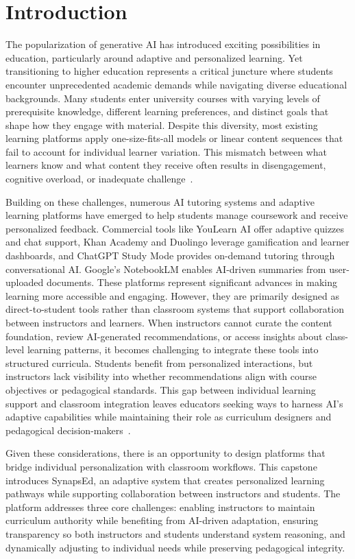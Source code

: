 \documentclass{stylefiles/capstone}
\begin{document}
\section{Introduction}

The popularization of generative AI has introduced exciting possibilities in education, particularly around adaptive and personalized learning. Yet transitioning to higher education represents a critical juncture where students encounter unprecedented academic demands while navigating diverse educational backgrounds. Many students enter university courses with varying levels of prerequisite knowledge, different learning preferences, and distinct goals that shape how they engage with material. Despite this diversity, most existing learning platforms apply one-size-fits-all models or linear content sequences that fail to account for individual learner variation. This mismatch between what learners know and what content they receive often results in disengagement, cognitive overload, or inadequate challenge~\cite{ausubel1978educational}.

Building on these challenges, numerous AI tutoring systems and adaptive learning platforms have emerged to help students manage coursework and receive personalized feedback. Commercial tools like YouLearn AI offer adaptive quizzes and chat support, Khan Academy and Duolingo leverage gamification and learner dashboards, and ChatGPT Study Mode provides on-demand tutoring through conversational AI. Google's NotebookLM enables AI-driven summaries from user-uploaded documents. These platforms represent significant advances in making learning more accessible and engaging. However, they are primarily designed as direct-to-student tools rather than classroom systems that support collaboration between instructors and learners. When instructors cannot curate the content foundation, review AI-generated recommendations, or access insights about class-level learning patterns, it becomes challenging to integrate these tools into structured curricula. Students benefit from personalized interactions, but instructors lack visibility into whether recommendations align with course objectives or pedagogical standards. This gap between individual learning support and classroom integration leaves educators seeking ways to harness AI's adaptive capabilities while maintaining their role as curriculum designers and pedagogical decision-makers~\cite{Herrmann-Werner2024,chaudhry2022transparencyindexframeworkai}.

Given these considerations, there is an opportunity to design platforms that bridge individual personalization with classroom workflows. This capstone introduces SynapsEd, an adaptive system that creates personalized learning pathways while supporting collaboration between instructors and students. The platform addresses three core challenges: enabling instructors to maintain curriculum authority while benefiting from AI-driven adaptation, ensuring transparency so both instructors and students understand system reasoning, and dynamically adjusting to individual needs while preserving pedagogical integrity.
\end{document}
